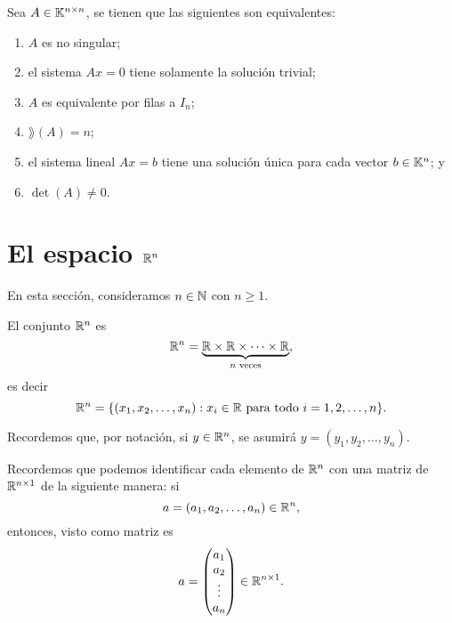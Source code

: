 \documentclass[a4,11pt]{aleph-notas}
\begin{document}
\begin{teo}
    
    Sea $A \in \Mat[\K]{n}{n}$, se tienen que las siguientes son equivalentes:
    \begin{enumerate}
    \item 
        $A$ es no singular;
    \item 
        el sistema $Ax=0$ tiene solamente la solución trivial;
    \item 
        $A$ es equivalente por filas a $I_n$;
    \item 
        $\rang(A)=n$; 
    \item 
        el sistema lineal $Ax=b$ tiene una solución única para cada vector $b \in \K^{n}$; y
    \item 
        $\det(A) \neq 0$.
    \end{enumerate}
\end{teo}

\section{El espacio $\R^n$}

En esta sección, consideramos $n\in\N$ con $n\geq 1$.

\begin{defi}[El conjunto $\R^n$]
    El conjunto $\R^n$ es
    \[
        \R^n=\underbrace{\R\times\R\times\cdots\times\R}_{n\text{ veces}},
    \]
    es decir
    \[
        \R^n=\{(x_1,x_2,\ldots,x_n):x_i\in\R\text{ para todo }i=1,2,\ldots,n\}.
    \]
\end{defi}

\begin{advertencia}
    Recordemos que, por notación, si $y\in\R^n$, se asumirá $y=(y_1,y_2,\ldots,y_n)$.
\end{advertencia}

\begin{advertencia}
    Recordemos que podemos identificar cada elemento de $\R^n$ con una matriz de $\Mat{n}{1}$ de la siguiente manera: si
    \[
        a = (a_1,a_2,\ldots,a_n) \in \R^n,
    \]
    entonces, visto como matriz es
    \[
        a = 
        \begin{pmatrix}
            a_1\\a_2\\
            \vdots\\a_n
        \end{pmatrix}
        \in \Mat{n}{1}.
    \]
\end{advertencia}
\end{document}
